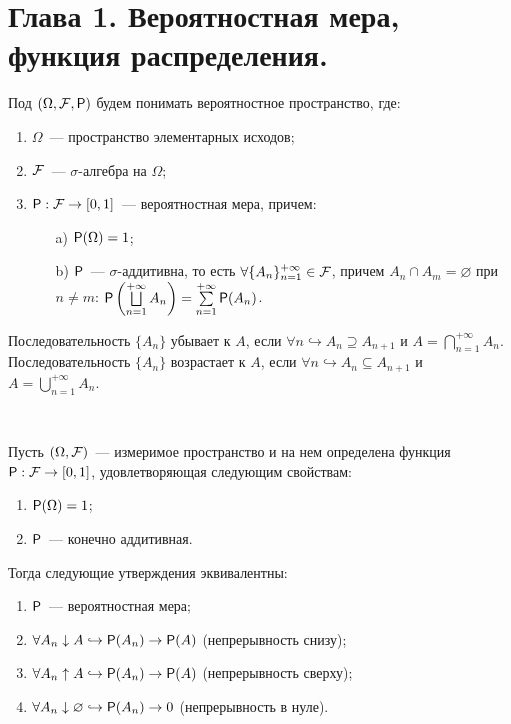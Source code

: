 \section{Глава 1. Вероятностная мера, функция распределения.}
\begin{definition}
    Под $(\Omega, \F, \P)$ будем понимать вероятностное пространство, где:
    \begin{enumerate}
    	\item $\Omega$~--- пространство элементарных исходов;
    	\item $\F$~--- $\sigma$-алгебра на $\Omega$;
    	\item{$\P: \F \rightarrow [0, 1]$~--- вероятностная мера, причем:
    		\begin{enumerate}
    			\item[a)] $\P (\Omega) = 1$;
    			\item[b)] $\P$~--- $\sigma$-аддитивна, то есть $\forall \{A_n\}_{n = 1}^{+\infty} \in \F$, причем $A_n \cap A_m = \varnothing$ при $n \neq m$: $\P \left( \bigsqcup\limits_{n=1}^{+\infty} A_n \right) = \sum \limits_{n = 1}^{+\infty} \P (A_n)$.
    		\end{enumerate}
    	}
    \end{enumerate}
\end{definition}

\begin{definition}
	Последовательность $\{A_n\}$ убывает к $A$, если $\forall n \hookrightarrow A_{n} \supseteq A_{n+1}$ и   $A = \bigcap\limits_{n = 1}^{+\infty} A_n$.
	Последовательность $\{A_n\}$ возрастает к $A$, если $\forall n \hookrightarrow A_{n} \subseteq A_{n+1}$ и   $A = \bigcup\limits_{n = 1}^{+\infty} A_n$.
\end{definition}

\begin{theorem}~

	Пусть $(\Omega, \F )$~--- измеримое пространство и на нем определена функция $\P: \F \rightarrow [0,1]$, удовлетворяющая следующим свойствам: 
	\begin{enumerate}
	    \item $\P (\Omega) = 1$;
	    \item  $\P$~--- конечно аддитивная.
	\end{enumerate} 
	Тогда следующие утверждения эквивалентны:
	\begin{enumerate}
		\item $\P$~--- вероятностная мера;
		\item $\forall A_n \downarrow A \hookrightarrow \P (A_n) \rightarrow \P(A)$ (непрерывность снизу);
		\item $\forall A_n \uparrow A \hookrightarrow \P (A_n) \rightarrow \P(A)$ (непрерывность сверху);
		\item  $\forall A_n \downarrow \varnothing \hookrightarrow \P (A_n) \rightarrow 0$ (непрерывность в нуле).
	\end{enumerate}
\end{theorem}

